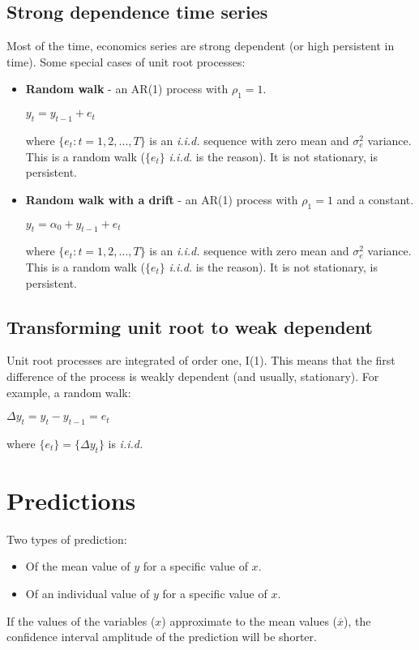 \documentclass[10pt, a4paper, landscape]{extarticle}
\begin{document}
\begin{multicols}{3}
	\subsection*{Strong dependence time series}
		Most of the time, economics series are strong dependent (or high persistent in time). Some special cases of unit root processes:
		\begin{itemize}[leftmargin=*]
			\item \textbf{Random walk} - an AR(1) process with $\rho_1 = 1$.
			\begin{center}
				$y_t = y_{t-1} + e_t$
			\end{center}
			where $\lbrace e_t : t = 1, 2, ..., T \rbrace$ is an \textsl{i.i.d.} sequence with zero mean and $\sigma^2_e$ variance.
			\\ This is a random walk ($\lbrace e_t \rbrace$ \textsl{i.i.d.} is the reason). It is not stationary, is persistent.
			\item \textbf{Random walk with a drift} - an AR(1) process with $\rho_1 = 1$ and a constant.
			\begin{center}
				$y_t = \alpha_0 + y_{t-1} + e_t$
			\end{center}
			where $\lbrace e_t : t = 1, 2, ..., T \rbrace$ is an \textsl{i.i.d.} sequence with zero mean and $\sigma^2_e$ variance.
			\\ This is a random walk ($\lbrace e_t \rbrace$ \textsl{i.i.d.} is the reason). It is not stationary, is persistent.
		\end{itemize}

	\subsection*{Transforming unit root to weak dependent}
		Unit root processes are integrated of order one, I(1). This means that the first difference of the process is weakly dependent (and usually, stationary). For example, a random walk:
		\begin{center}
			$\Delta y_t = y_t - y_{t-1} = e_t$
		\end{center}
		where $\lbrace e_t \rbrace = \lbrace \Delta y_t \rbrace$  is \textsl{i.i.d.}

\columnbreak

\section*{Predictions}
	Two types of prediction:
	\begin{itemize}[leftmargin=*]
		\item Of the mean value of $y$ for a specific value of $x$.
		\item Of an individual value of $y$ for a specific value of $x$.
	\end{itemize}
	If the values of the variables ($x$) approximate to the mean values ($\overline{x}$), the confidence interval amplitude of the prediction will be shorter. 


\end{multicols}
\end{document}
